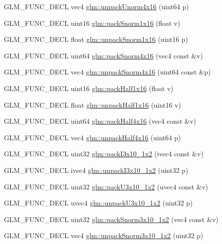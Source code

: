 \begin{CompactItemize}
\item 
GLM\_\-FUNC\_\-DECL vec4 \hyperlink{group__gtc__packing_gfb2b502bc406031a5618ce930139a9e3}{glm::unpackUnorm4x16} (uint64 p)
\item 
GLM\_\-FUNC\_\-DECL uint16 \hyperlink{group__gtc__packing_gc29411d6c0f6ed0fe9f0396dfe92e0e8}{glm::packSnorm1x16} (float v)
\item 
GLM\_\-FUNC\_\-DECL float \hyperlink{group__gtc__packing_g246f451cebf590726324f7a283e3d65e}{glm::unpackSnorm1x16} (uint16 p)
\item 
GLM\_\-FUNC\_\-DECL uint64 \hyperlink{group__gtc__packing_g9b237d7c66b7a71964e6d1f4dc06539f}{glm::packSnorm4x16} (vec4 const \&v)
\item 
GLM\_\-FUNC\_\-DECL vec4 \hyperlink{group__gtc__packing_gdb01fc0530f07beb509c89d97b6f4d20}{glm::unpackSnorm4x16} (uint64 const \&p)
\item 
GLM\_\-FUNC\_\-DECL uint16 \hyperlink{group__gtc__packing_gba534b320836a35372e00af5771dd1a2}{glm::packHalf1x16} (float v)
\item 
GLM\_\-FUNC\_\-DECL float \hyperlink{group__gtc__packing_ga6eebcdfc746584b7d1823f1d5344fed}{glm::unpackHalf1x16} (uint16 v)
\item 
GLM\_\-FUNC\_\-DECL uint64 \hyperlink{group__gtc__packing_g8104f0b719b7792491f2b789a6dd6f96}{glm::packHalf4x16} (vec4 const \&v)
\item 
GLM\_\-FUNC\_\-DECL vec4 \hyperlink{group__gtc__packing_gea526d6491ad40401eac34803984bf27}{glm::unpackHalf4x16} (uint64 p)
\item 
GLM\_\-FUNC\_\-DECL uint32 \hyperlink{group__gtc__packing_g032e18fa5bc5b8f3897104aeb2f1e195}{glm::packI3x10\_\-1x2} (ivec4 const \&v)
\item 
GLM\_\-FUNC\_\-DECL ivec4 \hyperlink{group__gtc__packing_g08bcd34cf9c34701d658dd861ee6e300}{glm::unpackI3x10\_\-1x2} (uint32 p)
\item 
GLM\_\-FUNC\_\-DECL uint32 \hyperlink{group__gtc__packing_gf656d8862628f96b20de7a36eaa1fe56}{glm::packU3x10\_\-1x2} (uvec4 const \&v)
\item 
GLM\_\-FUNC\_\-DECL uvec4 \hyperlink{group__gtc__packing_g119aa2d7d55952f9dc4214390a6ffefc}{glm::unpackU3x10\_\-1x2} (uint32 p)
\item 
GLM\_\-FUNC\_\-DECL uint32 \hyperlink{group__gtc__packing_g0d4157cec37c0312216a7be1cc92df54}{glm::packSnorm3x10\_\-1x2} (vec4 const \&v)
\item 
GLM\_\-FUNC\_\-DECL vec4 \hyperlink{group__gtc__packing_g8b8bb827a3743ca553d8702d3e337101}{glm::unpackSnorm3x10\_\-1x2} (uint32 p)

\end{CompactItemize}
